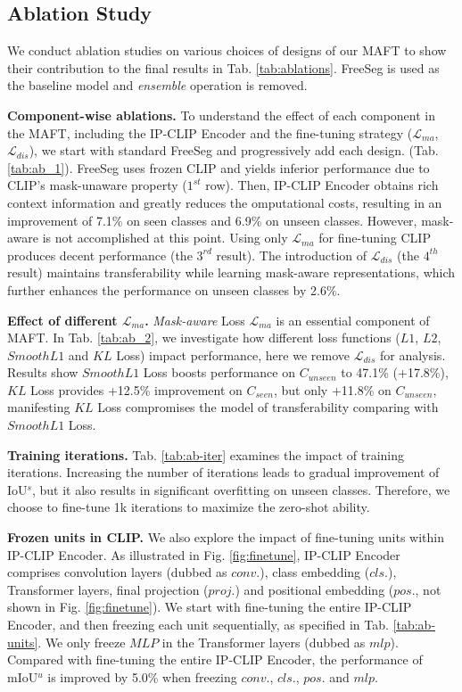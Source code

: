 \subsection{Ablation Study}


We conduct ablation studies on various choices of designs of our MAFT to show their contribution to the final results in Tab. \ref{tab:ablations}. FreeSeg is used as the baseline model and \textit{ensemble} operation is removed.

\noindent \textbf{Component-wise ablations.} To understand the effect of each component in the MAFT, including the IP-CLIP Encoder and the fine-tuning strategy ($\mathcal{L}_{ma}$, $\mathcal{L}_{dis}$), we start with standard FreeSeg and progressively add each design. (Tab. \ref{tab:ab_1}). 
FreeSeg uses frozen CLIP and yields inferior performance due to CLIP's mask-unaware property ($1^{st}$ row). Then, IP-CLIP Encoder obtains rich context information and greatly reduces the omputational costs, resulting in an improvement of 7.1\% on seen classes and 6.9\% on unseen classes. However, mask-aware is not accomplished at this point.
Using only $\mathcal{L}_{ma}$ for fine-tuning CLIP produces decent performance  (the $3^{rd}$ result). The introduction of $\mathcal{L}_{dis}$ (the $4^{th}$ result) maintains transferability while learning mask-aware representations, which further enhances the performance on unseen classes by 2.6\%.

\noindent \textbf{Effect of different $\mathcal{L}_{ma}$.} 
\textit{Mask-aware} Loss $\mathcal{L}_{ma}$ is an essential component of MAFT. In Tab. \ref{tab:ab_2}, we investigate how different loss functions ($L1$, $L2$, $SmoothL1$ and $KL$ Loss) impact performance, here we remove $\mathcal{L}_{dis}$ for analysis. Results show $SmoothL1$ Loss boosts performance on $C_{unseen}$ to 47.1\% (+17.8\%), $KL$ Loss provides +12.5\% improvement on $C_{seen}$, but only +11.8\% on $C_{unseen}$, manifesting $KL$ Loss compromises the model of transferability comparing with $SmoothL1$ Loss.

\noindent \textbf{Training iterations.} 
Tab. \ref{tab:ab-iter} examines the impact of training iterations. Increasing the number of iterations leads to gradual improvement of IoU$^s$, but it also results in significant overfitting on unseen classes. Therefore, we choose to fine-tune 1k iterations to maximize the zero-shot ability.

\noindent \textbf{Frozen units in CLIP.} 
We also explore the impact of fine-tuning units within IP-CLIP Encoder. As illustrated in Fig. \ref{fig:finetune}, IP-CLIP Encoder comprises convolution layers (dubbed as $conv.$), class embedding ($cls.$), Transformer layers, final projection ($proj.$) and positional embedding ($pos.$, not shown in Fig. \ref{fig:finetune}). We start with fine-tuning the entire IP-CLIP Encoder, and then freezing each unit sequentially, as specified in Tab. \ref{tab:ab-units}. We only freeze $MLP$ in the Transformer layers (dubbed as $mlp$). Compared with fine-tuning the entire IP-CLIP Encoder, the performance of mIoU$^u$ is improved by 5.0\% when freezing $conv.$, $cls.$, $pos.$ and $mlp$.

